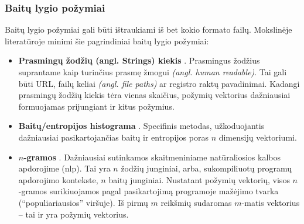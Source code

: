 \subsubsection{Baitų lygio požymiai}\label{sec:literature:features:byte}
Baitų lygio požymiai gali būti ištraukiami iš bet kokio formato failų. Mokslinėje literatūroje minimi šie pagrindiniai baitų lygio požymiai:
\begin{itemize}
    \item \textbf{Prasmingų žodžių (angl. Strings) kiekis} \cite{andersonLearningEvadeStatic2018}. Prasmingus žodžius suprantame kaip turinčius prasmę žmogui \textit{(angl. human readable)}. Tai gali būti URL, failų keliai \textit{(angl. file paths)} ar registro raktų pavadinimai. Kadangi prasmingų žodžių kiekis tėra vienas skaičius, požymių vektorius dažniausiai formuojamas prijungiant ir kitus požymius.
    \item \textbf{Baitų/entropijos histograma} \cite{saxeDeepNeuralNetwork2015}. Specifinis metodas, užkoduojantis dažniausiai pasikartojančias baitų ir entropijos poras $n$ dimensijų vektoriumi.
    \item \textbf{$n$-gramos} \cite{zhuNgramMalGANEvading2022}. Dažniausiai sutinkamos skaitmeniniame natūraliosios kalbos apdorojime (\acs{nlp}). Tai yra $n$ žodžių junginiai, arba, sukompiliuotų programų apdorojimo kontekste, $n$ baitų junginiai. Nustatant požymių vektorių, visos $n$-gramos surikiuojamos pagal pasikartojimą programoje mažėjimo tvarka (\enquote{populiariausios} viršuje). Iš pirmų $m$ reikšmių sudaromas $m$-matis vektorius -- tai ir yra požymių vektorius.
\end{itemize}